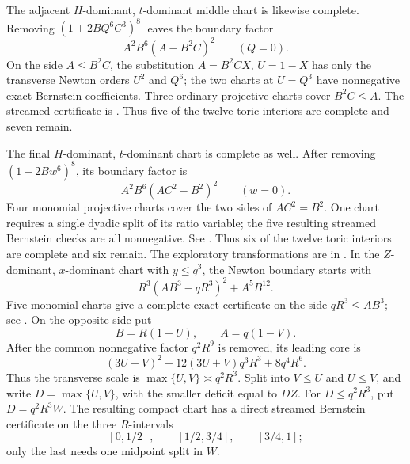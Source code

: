 \documentclass[11pt]{article}
\theoremstyle{remark}
\begin{document}
The adjacent \(H\)-dominant, \(t\)-dominant middle chart is likewise
complete.  Removing \((1+2BQ^6C^3)^8\) leaves the boundary factor
\[
                   A^2B^6(A-B^2C)^2\qquad (Q=0).
\]
On the side \(A\leq B^2C\), the substitution \(A=B^2CX\), \(U=1-X\)
has only the transverse Newton orders \(U^2\) and \(Q^6\); the two charts
at \(U=Q^3\) have nonnegative exact Bernstein coefficients.  Three ordinary
projective charts cover \(B^2C\leq A\).  The streamed certificate is
.  Thus five of the
twelve toric interiors are complete and seven remain.

The final \(H\)-dominant, \(t\)-dominant chart is complete as well.
After removing \((1+2Bw^6)^8\), its boundary factor is
\[
                   A^2B^6(AC^2-B^2)^2\qquad (w=0).
\]
Four monomial projective charts cover the two sides of \(AC^2=B^2\).
One chart requires a single dyadic split of its ratio variable; the five
resulting streamed Bernstein checks are all nonnegative.  See
.  Thus six of the
twelve toric interiors are complete and six remain.  The exploratory transformations are in
.  In the
\(Z\)-dominant, \(x\)-dominant chart with \(y\leq q^3\), the Newton boundary
starts with
\[
             R^3(AB^3-qR^3)^2+A^5B^{12}.
\]
Five monomial charts give a complete exact certificate on the side
\(qR^3\leq AB^3\); see
.  On the
opposite side put
\[
             B=R(1-U),\qquad A=q(1-V).
\]
After the common nonnegative factor \(q^2R^9\) is removed, its leading core
is
\[
 (3U+V)^2-12(3U+V)q^3R^3+8q^4R^6.
\]
Thus the transverse scale is
\(\max\{U,V\}\asymp q^2R^3\).  Split into \(V\leq U\) and \(U\leq V\),
and write \(D=\max\{U,V\}\), with the smaller deficit equal to \(DZ\).  For
\(D\leq q^2R^3\), put \(D=q^2R^3W\).  The resulting compact chart has a
direct streamed Bernstein certificate on the three \(R\)-intervals
\[
 [0,1/2],\qquad[1/2,3/4],\qquad[3/4,1];
\]
only the last needs one midpoint split in \(W\).
\end{document}
